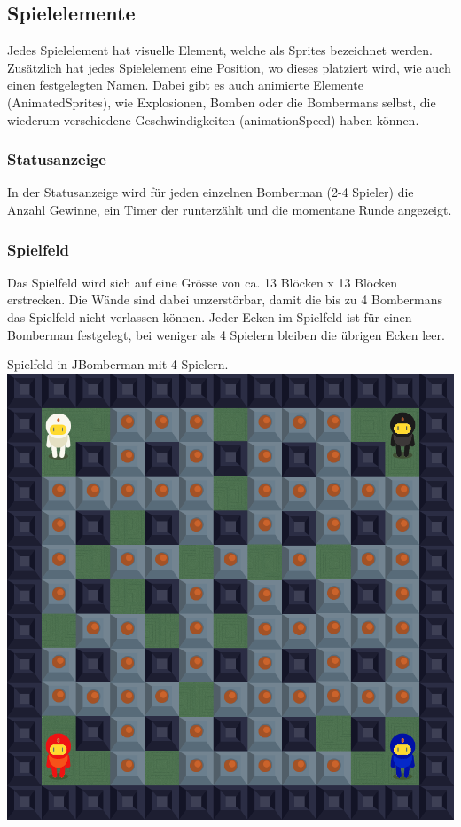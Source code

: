 \documentclass[11pt]{scrartcl}
\begin{document}
\subsection{Spielelemente}
\label{sec:Spielelemente}
Jedes Spielelement hat visuelle Element, welche als Sprites bezeichnet werden.
Zusätzlich hat jedes Spielelement eine Position, wo dieses platziert wird, 
wie auch einen festgelegten Namen.
Dabei gibt es auch animierte Elemente (AnimatedSprites), wie Explosionen, 
Bomben oder die Bombermans selbst, die wiederum verschiedene Geschwindigkeiten 
(animationSpeed) haben können.
\subsubsection{Statusanzeige}
\label{sec:Statusanzeige}
In der Statusanzeige wird für jeden einzelnen Bomberman (2-4 Spieler) die Anzahl 
Gewinne, ein Timer der runterzählt und die momentane Runde angezeigt.
\subsubsection{Spielfeld}
\label{sec:Spielfeld}
Das Spielfeld wird sich auf eine Grösse von ca. 13 Blöcken x 13 Blöcken 
erstrecken.
Die Wände sind dabei unzerstörbar, damit die bis zu 4 Bombermans das Spielfeld 
nicht verlassen können.
Jeder Ecken im Spielfeld ist für einen Bomberman festgelegt, bei weniger als 4 
Spielern bleiben die übrigen Ecken leer.
\begin{center}
Spielfeld in JBomberman mit 4 Spielern.
\includegraphics[scale=1.4]{bombermanmap} 
\end{center}
\end{document}
